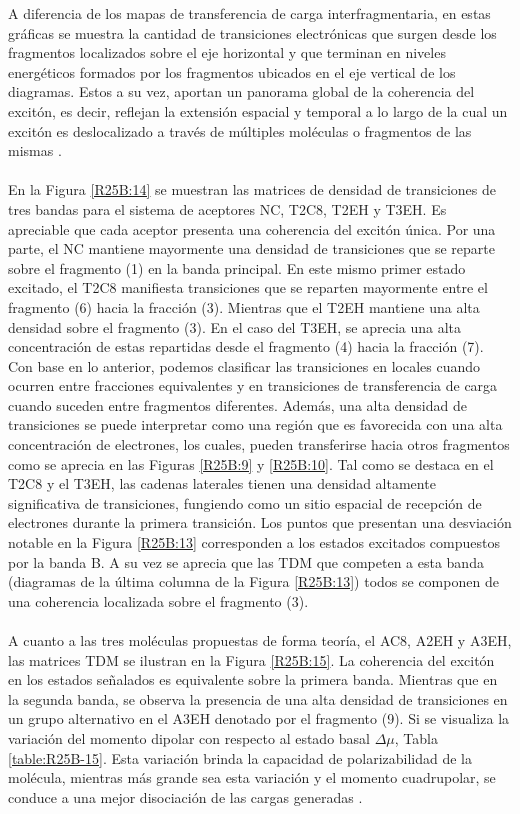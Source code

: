 \noindent A diferencia de los mapas de transferencia de carga interfragmentaria, en estas gráficas se muestra la cantidad de transiciones electrónicas que surgen desde los fragmentos localizados sobre el eje horizontal y que terminan en niveles energéticos formados por los fragmentos ubicados en el eje vertical de los diagramas. Estos a su vez, aportan un panorama global de la coherencia del excitón, es decir,  reflejan la extensión espacial y temporal a lo largo de la cual un excitón es deslocalizado a través de múltiples moléculas o fragmentos de las mismas  \cite{saleem2021designing}. \\ \\ En la Figura \ref{R25B:14} se muestran las matrices de densidad de transiciones de tres bandas para el sistema de aceptores NC, T2C8, T2EH y T3EH. Es apreciable que cada aceptor presenta una coherencia del excitón única. Por una parte, el NC mantiene mayormente una densidad de transiciones que se reparte sobre el fragmento (1) en la banda principal. En este mismo primer estado excitado, el T2C8 manifiesta transiciones que se reparten mayormente entre el fragmento (6) hacia la fracción (3). Mientras que el T2EH mantiene una alta densidad sobre el fragmento (3). En el caso del T3EH, se aprecia una alta concentración de estas repartidas desde el fragmento (4) hacia la fracción (7). Con base en lo anterior, podemos clasificar las transiciones en locales cuando ocurren entre fracciones equivalentes y en transiciones de transferencia de carga cuando suceden entre fragmentos diferentes. Además, una alta densidad de transiciones se puede interpretar como una región que es favorecida con una alta concentración de electrones, los cuales, pueden transferirse hacia otros fragmentos como se aprecia en las Figuras  \ref{R25B:9} y \ref{R25B:10}. Tal como se destaca en el T2C8 y el T3EH, las cadenas laterales tienen una densidad altamente significativa de transiciones, fungiendo como un sitio espacial de recepción de electrones durante la primera transición. Los puntos que presentan una desviación notable en la Figura \ref{R25B:13} corresponden a los estados excitados compuestos por la banda B. A su vez se aprecia que las TDM que competen a esta banda (diagramas de la última columna de la Figura \ref{R25B:13}) todos se componen de una coherencia localizada sobre el fragmento (3). \\ \\
A cuanto a las tres moléculas propuestas de forma teoría, el AC8, A2EH y A3EH, las matrices TDM se ilustran en la Figura \ref{R25B:15}. La coherencia del excitón en los estados señalados es equivalente sobre la primera banda. Mientras que en la segunda banda, se observa la presencia de una alta densidad de transiciones en un grupo alternativo en el A3EH denotado por el fragmento (9). Si se visualiza la variación del momento dipolar con respecto al estado basal $\Delta \mu$, Tabla \ref{table:R25B-15}. Esta variación brinda la capacidad de polarizabilidad de la molécula, mientras más grande sea esta variación y el momento cuadrupolar, se conduce a una mejor disociación de las cargas generadas \cite{wang2024physical}. 
